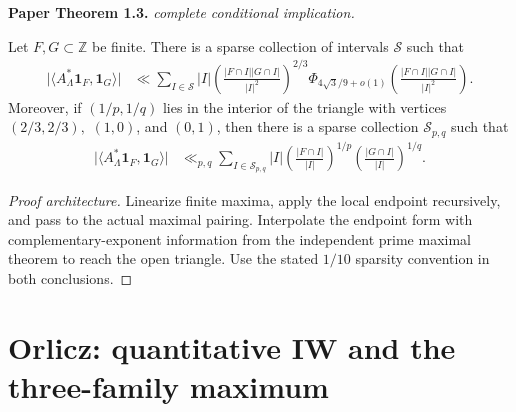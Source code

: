 \begin{theorem}
\label{prime_sparse}
\leanok
\par\medskip\noindent\textbf{Paper Theorem 1.3.} \textit{complete conditional implication.}\par
Let \(F,G\subset\mathbb Z\) be finite.  There is a sparse collection of
intervals \(\mathcal S\) such that
\begin{align}
 \bigl|\langle A_\Lambda^*\mathbf1_F,\mathbf1_G\rangle\bigr|
 &\ll \sum_{I\in\mathcal S}|I|
 \left(\frac{|F\cap I||G\cap I|}{|I|^2}\right)^{2/3}
 \Phi_{4\sqrt3/9+o(1)}
 \left(\frac{|F\cap I||G\cap I|}{|I|^2}\right).
\end{align}
Moreover, if \((1/p,1/q)\) lies in the interior of the triangle with
vertices $(2/3,2/3),$ $(1,0)$, and $(0,1)$, 
then there is a sparse collection \(\mathcal S_{p,q}\) such that
\begin{align}
 \bigl|\langle A_\Lambda^*\mathbf1_F,\mathbf1_G\rangle\bigr|
 &\ll_{p,q}
 \sum_{I\in\mathcal S_{p,q}}|I|
 \left(\frac{|F\cap I|}{|I|}\right)^{1/p}
 \left(\frac{|G\cap I|}{|I|}\right)^{1/q}.
\end{align}
\end{theorem}
\begin{proof}[Proof architecture]
\leanok
Linearize finite maxima, apply the local endpoint recursively, and pass to the actual maximal pairing. Interpolate the endpoint form with complementary-exponent information from the independent prime maximal theorem to reach the open triangle. Use the stated $1/10$ sparsity convention in both conclusions.
\end{proof}

\section{Orlicz: quantitative IW and the three-family maximum}


